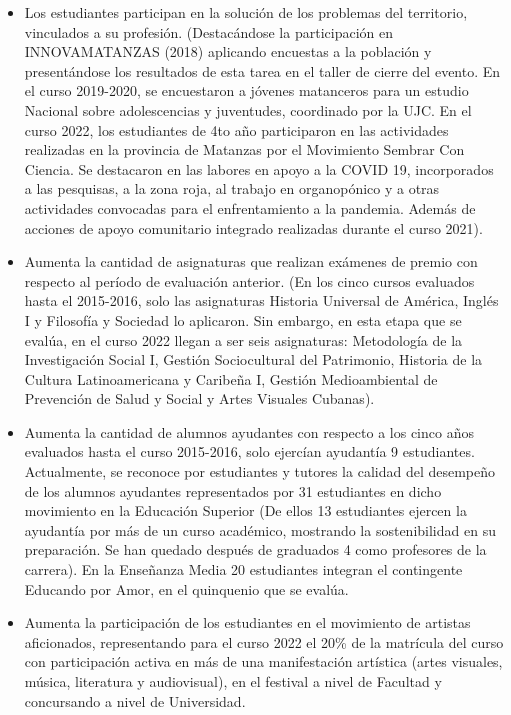 \begin{itemize}
	\setlength\itemsep{-0.5em}
	\item Los estudiantes participan en la solución de los problemas del territorio, vinculados a su profesión. (Destacándose la participación en INNOVAMATANZAS (2018) aplicando encuestas a la población y presentándose los resultados de esta tarea en el taller de cierre del evento. En el curso 2019-2020, se encuestaron a jóvenes matanceros para un estudio Nacional sobre adolescencias y juventudes, coordinado por la UJC. En el curso 2022, los estudiantes de 4to año participaron en las actividades realizadas en la provincia de Matanzas por el Movimiento Sembrar Con Ciencia. Se destacaron en las labores en apoyo a la COVID 19, incorporados a las pesquisas, a la zona roja, al trabajo en organopónico y a otras actividades convocadas para el enfrentamiento a la pandemia. Además de acciones de apoyo comunitario integrado realizadas durante el curso 2021).
	
	\item Aumenta la cantidad de asignaturas que realizan exámenes de premio con respecto al período de evaluación anterior. (En los cinco cursos evaluados hasta el 2015-2016, solo las asignaturas Historia Universal de América, Inglés I y Filosofía y Sociedad lo aplicaron. Sin embargo, en esta etapa que se evalúa,  en el curso 2022 llegan a ser seis asignaturas: Metodología de la Investigación Social I, Gestión Sociocultural del Patrimonio, Historia de la Cultura Latinoamericana y Caribeña I, Gestión Medioambiental de Prevención de Salud y Social y Artes Visuales Cubanas). 
	
	\item Aumenta la cantidad de alumnos ayudantes con respecto a los cinco años evaluados hasta el curso 2015-2016, solo ejercían ayudantía 9 estudiantes. Actualmente, se reconoce por estudiantes y tutores la calidad del desempeño de los alumnos ayudantes representados por 31 estudiantes en dicho movimiento en la Educación Superior (De ellos 13 estudiantes ejercen la ayudantía por más de un curso académico, mostrando la sostenibilidad en su preparación. Se han quedado después de graduados 4 como profesores de la carrera). En la Enseñanza Media 20 estudiantes integran el contingente Educando por Amor, en el quinquenio que se evalúa.
	
	\item Aumenta la participación de los estudiantes en el movimiento de artistas aficionados, representando para el curso 2022 el 20\% de la matrícula del curso con participación activa en más de una manifestación artística (artes visuales, música, literatura y audiovisual), en el festival a nivel de Facultad y concursando a nivel de Universidad.
	

\end{itemize}

